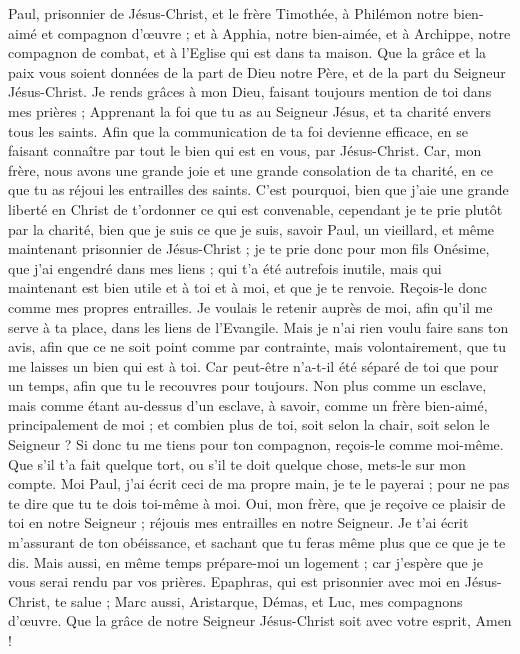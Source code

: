 \begin{multicols}{2}
\VerseOne{}Paul, prisonnier de Jésus-Christ, et le frère Timothée, à Philémon notre bien-aimé et compagnon d'œuvre ;
et à Apphia, notre bien-aimée, et à Archippe, notre compagnon de combat, et à l'Eglise qui est dans ta maison.
Que la grâce et la paix vous soient données de la part de Dieu notre Père, et de la part du Seigneur Jésus-Christ.
Je rends grâces à mon Dieu, faisant toujours mention de toi dans mes prières ;
Apprenant la foi que tu as au Seigneur Jésus, et ta charité envers tous les saints.
Afin que la communication de ta foi devienne efficace, en se faisant connaître par tout le bien qui est en vous, par  Jésus-Christ.
Car, mon frère, nous avons une grande joie et une grande consolation de ta charité, en ce que tu as réjoui les entrailles des saints.
C'est pourquoi, bien que j'aie une grande liberté en Christ de t’ordonner ce qui est convenable,
cependant je te prie plutôt par la charité, bien que je suis ce que je suis, savoir Paul, un vieillard, et même maintenant prisonnier de Jésus-Christ ;
je te prie donc pour mon fils Onésime, que j'ai engendré dans mes liens ;
qui t'a été autrefois inutile, mais qui maintenant est bien utile et à toi et à moi, et que je te renvoie.
Reçois-le donc comme mes propres entrailles.
Je voulais le retenir auprès de moi, afin qu'il me serve à ta place, dans les liens de l'Evangile.
Mais je n'ai rien voulu faire sans ton avis, afin que ce ne soit point comme par contrainte, mais volontairement, que tu me laisses un bien qui est à toi.
Car peut-être n'a-t-il été séparé de toi que pour un temps, afin que tu le recouvres pour toujours.
Non plus comme un esclave, mais comme étant au-dessus d'un esclave, à savoir, comme un frère bien-aimé, principalement de moi ; et combien plus de toi, soit selon la chair, soit selon le Seigneur ?
Si donc tu me tiens pour ton compagnon, reçois-le comme moi-même.
Que s'il t'a fait quelque tort, ou s'il te doit quelque chose, mets-le sur mon compte.
Moi Paul, j'ai écrit ceci de ma propre main, je te le payerai ; pour ne pas te dire que tu te dois toi-même à moi.
Oui, mon frère, que je reçoive ce plaisir de toi en notre Seigneur ; réjouis mes entrailles en notre Seigneur.
Je t'ai écrit m'assurant de ton obéissance, et sachant que tu feras même plus que ce que je te dis.
Mais aussi, en même temps prépare-moi un logement ; car j'espère que je vous serai rendu par vos prières.
Epaphras, qui est prisonnier avec moi en Jésus-Christ, te salue ;
Marc aussi, Aristarque, Démas, et Luc, mes compagnons d'œuvre.
Que la grâce de notre Seigneur Jésus-Christ soit avec votre esprit, Amen !
\PPE{}
\end{multicols}
